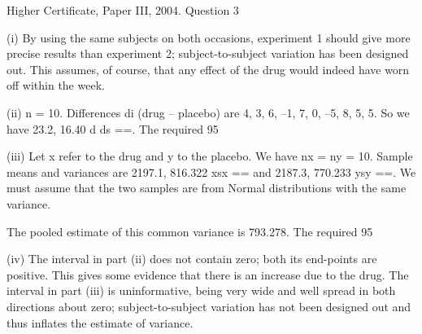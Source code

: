 \documentclass[a4paper,12pt]{article}
\begin{document}
Higher Certificate, Paper III, 2004.  Question 3 
 
 
(i) By using the same subjects on both occasions, experiment 1 should give more precise results than experiment 2;  subject-to-subject variation has been designed out.  This assumes, of course, that any effect of the drug would indeed have worn off within the week. 
 
 
(ii) n = 10.  Differences di (drug – placebo) are 4, 3, 6, –1, 7, 0, –5, 8, 5, 5.  So we have 23.2, 16.40 d ds ==.  The required 95%
 
 
(iii) Let x refer to the drug and y to the placebo.  We have nx = ny = 10.  Sample means and variances are 2197.1, 816.322 xsx == and 2187.3, 770.233 ysy ==.  We must assume that the two samples are from Normal distributions with the same variance. 
 
The pooled estimate of this common variance is 793.278.  The required 95%
 
 
(iv) The interval in part (ii) does not contain zero;  both its end-points are positive.  This gives some evidence that there is an increase due to the drug.  The interval in part (iii) is uninformative, being very wide and well spread in both directions about zero;  subject-to-subject variation has not been designed out and thus inflates the estimate of variance. 
 
\end{document}
